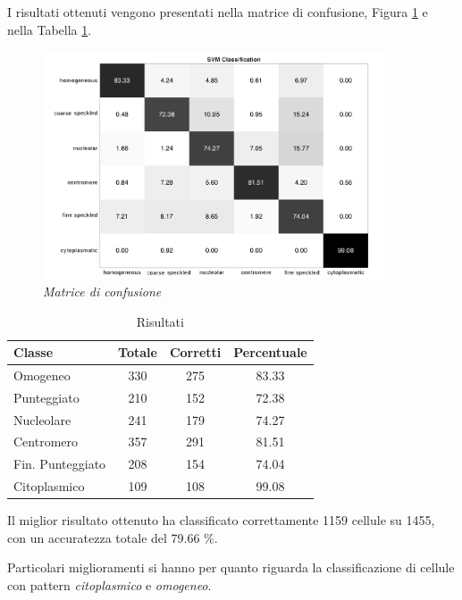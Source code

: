 I risultati ottenuti vengono presentati nella matrice di confusione, Figura \ref{fig:mat2} e nella Tabella \ref{table:2}.

\begin{figure}[H] 
  \centering
    \includegraphics[width=0.9\textwidth]{images/conf_mat_2.png}
    \caption{{\small \textit{Matrice di confusione}}}
    \label{fig:mat2}
\end{figure}

\begin{table}[H]
\centering
\footnotesize
\begin{tabular}{|l | c | c | c |} 
 \hline 
 \textbf{Classe} &  \textbf{Totale} & \textbf{Corretti} & \textbf{Percentuale} \\ [0.5ex] 
 \hline\hline
 Omogeneo & 330 & 275 & 83.33\\
 Punteggiato & 210 & 152 & 72.38\\
 Nucleolare & 241 & 179 & 74.27\\
 Centromero & 357 & 291 & 81.51\\
 Fin. Punteggiato & 208 & 154 & 74.04\\
 Citoplasmico & 109 & 108 & 99.08\\
 \hline
\end{tabular}
\caption{Risultati}
\label{table:2}
\end{table}


Il miglior risultato ottenuto ha classificato correttamente 1159 cellule su 1455, con un accuratezza totale del 79.66 \%.

Particolari miglioramenti si hanno per quanto riguarda la classificazione di cellule con pattern \emph{citoplasmico} e \emph{omogeneo}.
